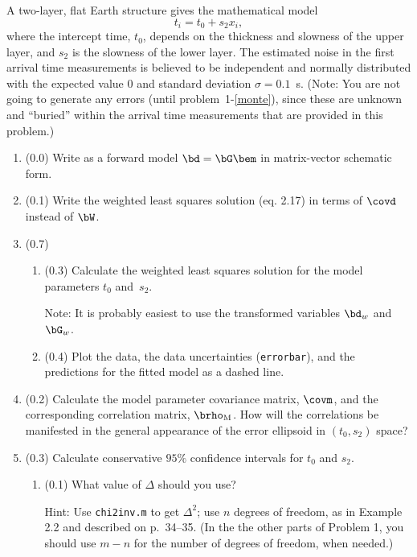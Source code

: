 \documentclass[11pt,titlepage,fleqn]{article}
\begin{document}
A two-layer, flat Earth structure gives the mathematical model
%
\begin{equation}
t_i = t_0 + s_2x_i,
\label{twolayer}
\end{equation}
%
where the intercept time, $t_0$, depends on the thickness and slowness of the upper layer, and $s_2$ is the slowness of the lower layer. The estimated noise in the first arrival time measurements is believed to be independent and normally distributed with the expected value 0 and standard deviation $\sigma = 0.1$~s. (Note: You are not going to generate any errors (until problem~1-\ref{monte}), since these are unknown and ``buried'' within the arrival time measurements that are provided in this problem.)
%
\begin{enumerate}
\item (0.0) Write  as a forward model $\bd = \bG\bem$ in matrix-vector schematic form.

\item (0.1) Write the weighted least squares solution (eq. 2.17) in terms of $\covd$ instead of $\bW$.

\item (0.7) 
\begin{enumerate}
\item (0.3) Calculate the weighted least squares solution for the model parameters $t_0$ and~$s_2$.

Note: It is probably easiest to use the transformed variables $\bd_w$ and $\bG_w$.
\item (0.4) Plot the data, the data uncertainties (\verb+errorbar+), and the predictions for the fitted model as a dashed line.
\end{enumerate}


\item (0.2) Calculate the model parameter covariance matrix, $\covm$, and the corresponding correlation matrix, $\brho_{\rm M}$. How will the correlations be manifested in the general appearance of the error ellipsoid in $(t_0, s_2)$ space?

\pagebreak
\item (0.3) Calculate conservative $95\%$ confidence intervals for $t_0$ and $s_2$.
%
\begin{enumerate}
\item (0.1) What value of $\Delta$ should you use?

Hint: Use \verb+chi2inv.m+ to get $\Delta^2$; use $n$ degrees of freedom, as in Example 2.2 and described on p.~34--35. (In the the other parts of Problem 1, you should use $m-n$ for the number of degrees of freedom, when needed.)


\end{enumerate}
\end{enumerate}
\end{document}
